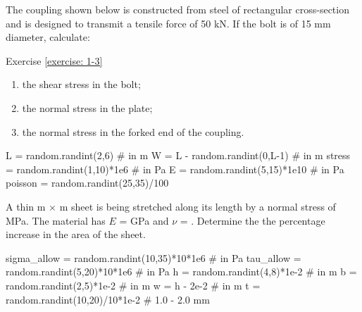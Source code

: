 \documentclass[
10pt,
a4paper,
openany,
svgnames,
]{kaobook} %
\begin{document}
\begin{exercises}
  \item \label{exercise: 1-3} The coupling shown below is constructed from steel of rectangular cross-section and is designed to transmit a tensile force of 50 kN. If the bolt is of 15 mm diameter, calculate:

  \begin{marginfigure}
    \centering
    \caption{Exercise \ref{exercise: 1-3}}
  \end{marginfigure}

  \begin{enumerate}
  \item the shear stress in the bolt;
  \item the normal stress in the plate;
  \item the normal stress in the forked end of the coupling.
  \end{enumerate}

\begin{pycode}
L = random.randint(2,6) # in m
W = L - random.randint(0,L-1) # in m
stress = random.randint(1,10)*1e6 # in Pa
E = random.randint(5,15)*1e10 # in Pa
poisson = random.randint(25,35)/100
\end{pycode}

  \item A thin  m $\times$  m sheet is being stretched along its length by a normal stress of  MPa. The material has $E$ =  GPa and $\nu$ = . Determine the the percentage increase in the area of the sheet.

\begin{pycode}
sigma_allow = random.randint(10,35)*10*1e6 # in Pa
tau_allow = random.randint(5,20)*10*1e6 # in Pa
h = random.randint(4,8)*1e-2 # in m
b = random.randint(2,5)*1e-2 # in m
w = h - 2e-2 # in m
t = random.randint(10,20)/10*1e-2 # 1.0 - 2.0 mm
\end{pycode}


\end{exercises}
\end{document}
